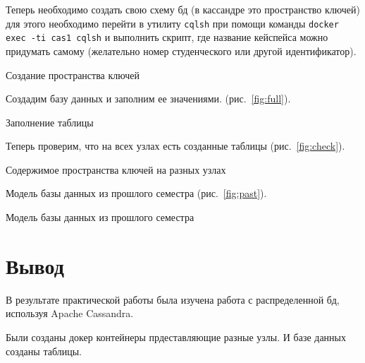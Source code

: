 Теперь необходимо создать свою схему бд (в кассандре это
пространство ключей) для этого необходимо перейти в утилиту \texttt{cqlsh}
при помощи команды \texttt{docker exec -ti cas1 cqlsh} и выполнить скрипт,
где название кейспейса можно придумать самому (желательно номер
студенческого или другой идентификатор).

\begin{image}
	\caption{Создание пространства ключей}
	\label{fig:keyspace}
\end{image}

Создадим базу данных и заполним ее значениями.
(рис.~\ref{fig:full}).

\begin{image}
	\caption{Заполнение таблицы}
	\label{fig:full}
\end{image}

Теперь проверим, что на всех узлах есть созданные таблицы
(рис.~\ref{fig:check}).

\begin{image}
	\caption{Содержимое пространства ключей на разных узлах}
	\label{fig:check}
\end{image}

\clearpage

Модель базы данных из прошлого семестра (рис.~\ref{fig:past}).

\begin{image}
	\caption{Модель базы данных из прошлого семестра}
	\label{fig:past}
\end{image}

\section*{\LARGE Вывод}
В результате практической работы была изучена работа
с распределенной бд, используя Apache Cassandra.\par
Были созданы докер контейнеры прдеставляющие разные узлы.
И базе данных созданы таблицы.